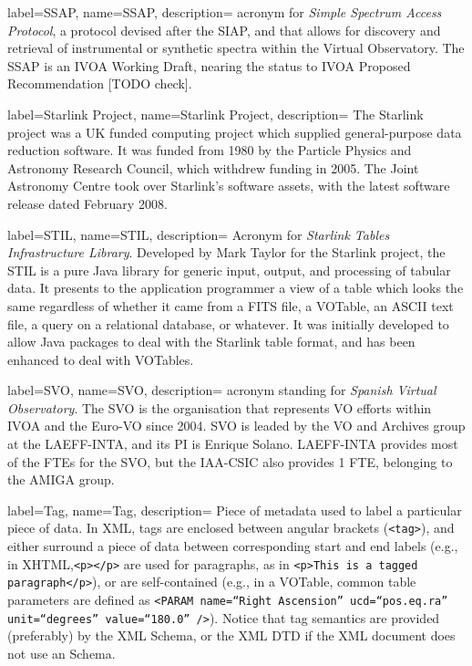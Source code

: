 {
    label={SSAP},
    name={SSAP},
    description={
    	acronym for \emph{Simple Spectrum Access Protocol}, a protocol
        devised after the \gls{SIAP}, and that allows for discovery and
        retrieval of instrumental or synthetic spectra within the
        \gls{Virtual Observatory}. The SSAP is an \gls{IVOA Working
        Draft}, nearing the status to \gls{IVOA Proposed
        Recommendation} [TODO check].
    }
}

{
    label={Starlink Project},
    name={Starlink Project},
    description={
    	 The Starlink project was a UK funded computing project which
         supplied general-purpose data reduction software. It was
         funded from 1980 by the Particle Physics and Astronomy
         Research Council, which withdrew funding in 2005. The Joint
         Astronomy Centre took over Starlink's software assets, with
         the latest software release dated February 2008.
    }
}

{
    label={STIL},
    name={STIL},
    description={
		Acronym for \emph{Starlink Tables Infrastructure Library}.
		Developed by Mark Taylor for the \gls{Starlink project},
		the STIL is a pure \gls{Java} library for generic input,
		output, and processing of tabular data. It presents to the
		application programmer a view of a table which looks the
		same regardless of whether it came from a \gls{FITS} file,
		a \gls{VOTable}, an \gls{ASCII} text file, a query on a
		relational database, or whatever. It was initially
		developed to allow Java packages to deal with the Starlink
		table format, and has been enhanced to deal with VOTables.
    }
}

{
    label={SVO},
    name={SVO},
    description={
    	acronym standing for \emph{Spanish Virtual Observatory}. The
        SVO is the organisation that represents VO efforts within
        \gls{IVOA} and the \gls{Euro-VO} since 2004. SVO is leaded by
        the VO and Archives group at the \gls{LAEFF-INTA}, and its PI
        is Enrique Solano. LAEFF-INTA provides most of the FTEs for the
        SVO, but the \gls{IAA-CSIC} also provides 1 FTE, belonging to
        the \gls{AMIGA} group.
    }
}

{
    label={Tag},
    name={Tag},
    description={
    	Piece of metadata used to label a particular piece of data. In
        \gls{XML}, tags are enclosed between angular brackets
        (\texttt{<tag>}), and either surround a piece of data between
        corresponding start and end labels (e.g., in
        \gls{XHTML},\texttt{<p></p>} are used for paragraphs, as in
        \texttt{<p>This is a tagged paragraph</p>}), or are
        self-contained (e.g., in a \gls{VOTable}, common table
        parameters are defined as \texttt{<PARAM name=``Right
        Ascension'' ucd=``pos.eq.ra'' unit=``degrees'' value=``180.0''
        />}). Notice that tag semantics are provided (preferably) by
        the XML Schema, or the XML DTD if the XML document does not use
        an Schema.
    }
}

